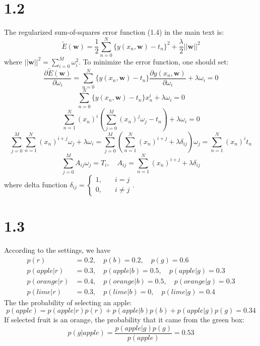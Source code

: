 \documentclass[10pt,a4paper,draft]{book}
\begin{document}
\section*{1.2}
The regularized sum-of-squares error function (1.4) in the main text is:
\begin{equation}
\tilde{E}(\bm{w}) = \frac{1}{2}\sum_{n=0}^N\{y(x_n,\bm{w}) - t_n\}^2 + \frac{\lambda}{2} ||\bm{w}||^2
\end{equation}
where $||\bm{w}||^2 = \sum_{i=0}^M \omega_i^2$. To minimize the error function, one should set:
\begin{equation}
\frac{\partial \tilde{E}(\bm{w})}{\partial \omega_i} =\sum_{n=0}^N \{y(x_n,\bm{w})-t_n\} \frac{\partial y(x_n,\bm{w})}{\partial \omega_i} +\lambda \omega_i=  0
\end{equation}
\begin{equation}
\sum_{n=0}^N \{y(x_n,\bm{w})-t_n\} x_n^i +\lambda \omega_i =0 
\end{equation}
\begin{equation}
\sum_{n=1}^{N} (x_n)^i\left(\sum_{j=0}^M (x_n)^{j}\omega_j - t_n\right) + \lambda \omega_i =0
\end{equation}
\begin{equation}
\sum_{j=0}^M \sum_{n=1}^{N} (x_n)^{i+j}\omega_j + \lambda \omega_i = \sum_{j=0}^M \left(\sum_{n=1}^{N} (x_n)^{i+j} + \lambda \delta_{ij}\right)\omega_j = \sum_{n=1}^{N} (x_n)^i t_n
\end{equation}
\begin{equation}
\sum_{j=0}^M A_{ij}\omega_j= T_i, \quad A_{ij} = \sum_{n=1}^{N} (x_n)^{i+j} + \lambda \delta_{ij} 
\end{equation}
where delta function $ \delta_{ij}=\left\{
\begin{aligned}
1,\quad & i = j \\
0,\quad & i \neq j
\end{aligned}
\right.$.

\section*{1.3}
According to the settings, we have
\begin{equation}
\begin{aligned}
p(r) &= 0.2, \quad p(b) = 0.2, \quad p(g) = 0.6 \\
p(apple|r) &= 0.3, \quad p(apple|b) = 0.5,\quad p(apple|g) = 0.3\\
p(orange|r) &= 0.4, \quad p(orange|b) = 0.5,\quad p(orange|g) = 0.3\\
p(lime|r) &= 0.3, \quad p(lime|b) = 0,\quad p(lime|g) = 0.4
\end{aligned}
\end{equation}
The the probability of selecting an apple:
\begin{equation}
p(apple) = p(apple|r)p(r) + p(apple|b)p(b) + p(apple|g)p(g) = 0.34
\end{equation}
If selected fruit is an orange, the probability that it came from the green box:
\begin{equation}
p(g|apple) = \frac{p(apple|g)p(g)}{p(apple)} = 0.53
\end{equation}
\end{document}
